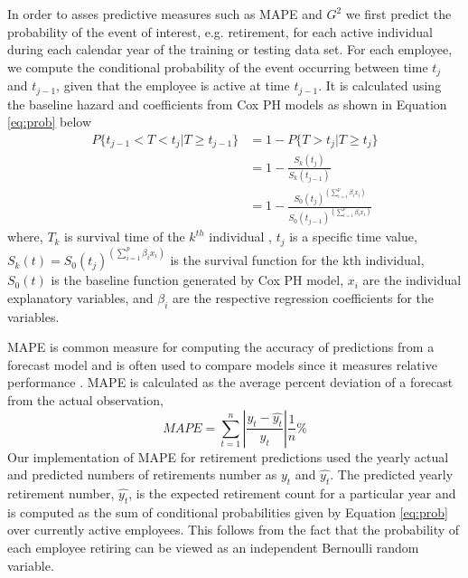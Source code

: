 \documentclass[12pt,letterpaper]{article}
\begin{document}
In order to asses predictive measures such as MAPE and $G^2$ we first predict the probability of the event of interest, e.g. retirement, for each active individual during each calendar year of the training or testing data set.  For each employee, we compute the conditional probability of the event occurring between time $t_j$ and $t_{j-1}$, given that the employee is active at time $t_{j-1}$. It is calculated using the baseline hazard and coefficients from Cox PH models as shown in Equation \ref{eq:prob} below
\begin{equation}
\label{eq:prob}
\begin{split}%
P\{t_{j-1}<T<t_j|T \ge t_{j-1}\} &=1-P\{T>t_j|T \ge t_j\}\\
&=1-\frac{S_k(t_j)}{S_k{(t_{j-1})}}   \\
&=1-\frac{{S_0(t_j)}^{(\sum_{i=1}^{p}\beta_ix_i)}}{   {S_0(t_{j-1})}^{(\sum_{i=1}^{p}\beta_ix_i)}}
\end{split}
\end{equation}
where, $T_k$ is survival time of the $k^{th}$ individual , $t_j$ is a specific time value, $S_k(t) = {S_0(t_j)}^{(\sum_{i=1}^{p}\beta_ix_i)}$ is the survival function for the kth individual, $S_0(t)$ is the baseline function generated by Cox PH model, $x_i$ are the individual explanatory variables, and $\beta_i$ are the respective regression coefficients for the variables.

MAPE is common measure for computing the accuracy of predictions from a forecast model and is often used to compare models since it measures relative performance \citep{chu1998}. MAPE is calculated as the average percent deviation of a forecast from the actual observation,
\begin{equation}
\label{eq:mape}
MAPE=\sum_{t=1}^{n}\left | \frac{y_t-\hat{y_t}}{y_t} \right |\frac{1}{n}\%
\end{equation}
Our implementation of MAPE for retirement predictions used the yearly actual and predicted numbers of retirements number as $y_t$ and $\hat{y_t}$. The predicted yearly retirement number, $\hat{y_t}$,  is the expected retirement count for a particular year and is computed as the sum of conditional probabilities given by Equation \ref{eq:prob} over currently active employees.  This follows from the fact that the probability of each employee retiring can be viewed as an independent Bernoulli random variable.
\end{document}
